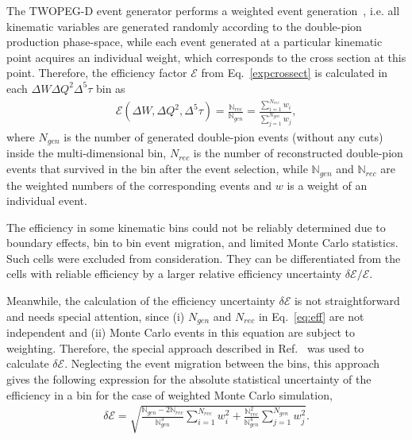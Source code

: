 The TWOPEG-D event generator performs a weighted event generation~\cite{twopeg}, i.e. all kinematic variables are generated randomly according to the double-pion production phase-space, while each event generated at a particular kinematic point acquires an individual weight, which corresponds to the cross section at this point.  Therefore, the efficiency factor $\mathcal{E}$ from Eq.~\eqref{expcrossect} is calculated in each $\Delta W\Delta Q^2\Delta^{5}\tau$ bin as\vspace{-0.5em}
\begin{equation}
\begin{aligned}
\mathcal{E}(\Delta W, \Delta Q^2, \Delta^{5}\tau) = \frac{\mathbb{N}_{rec}}{\mathbb{N}_{gen}} =  \frac{\sum\limits_{i=1}^{N_{rec}} w_{i}}{\sum\limits_{j=1}^{N_{gen}} w_{j}} ,
\end{aligned}
\label{eq:eff}
\end{equation}
where $N_{gen}$ is the number of generated double-pion events (without any cuts) inside the multi-dimensional bin, $N_{rec}$ is the number of reconstructed double-pion events that survived in the bin after the event selection, while $\mathbb{N}_{gen}$ and  $\mathbb{N}_{rec}$ are the weighted numbers of the corresponding events and $w$ is a weight of an individual event.

The efficiency in some kinematic bins could not be reliably determined due to boundary effects, bin to bin event migration, and limited Monte Carlo statistics. Such cells were excluded from consideration. They can be differentiated from the cells with reliable efficiency by a larger relative efficiency uncertainty $\delta \mathcal{E}/\mathcal{E}$.


Meanwhile, the calculation of the efficiency uncertainty $\delta \mathcal{E}$ is not straightforward and needs special attention, since (i) $N_{gen}$ and $N_{rec}$ in Eq.~\eqref{eq:eff} are not independent and (ii) Monte Carlo events in this equation are subject to weighting. Therefore, the special approach described in Ref.~\cite{Laforge:1996ts} was used to calculate $\delta \mathcal{E}$. Neglecting the event migration between the bins, this approach gives the following expression for the absolute statistical uncertainty of the efficiency in a bin for the case of weighted Monte Carlo simulation,
\begin{equation}
\begin{aligned}
\delta \mathcal{E} = \sqrt{\frac{\mathbb{N}_{gen} - 2\mathbb{N}_{rec}}{\mathbb{N}_{gen}^{3}}\sum\limits_{i=1}^{N_{rec}} w_{i}^{2} + \frac{\mathbb{N}_{rec}^{2}}{\mathbb{N}_{gen}^{4}}\sum\limits_{j=1}^{N_{gen}} w_{j}^{2}}.
\end{aligned}
\label{eq:eff_err_weighted}
\end{equation}

